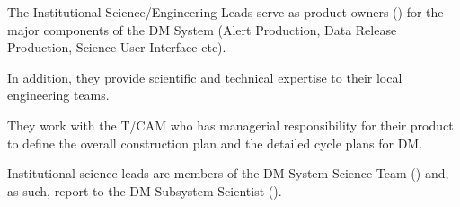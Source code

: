 The Institutional Science/Engineering Leads serve as product owners () for the major components of the DM System (Alert Production, Data Release Production, Science User Interface etc).

In addition, they provide scientific and technical expertise to their local engineering teams.

They work with the T/CAM who has managerial responsibility for their product to define the overall construction plan and the detailed cycle plans for DM.

Institutional science leads are members of the DM System Science Team () and, as such, report to the DM Subsystem Scientist ().
